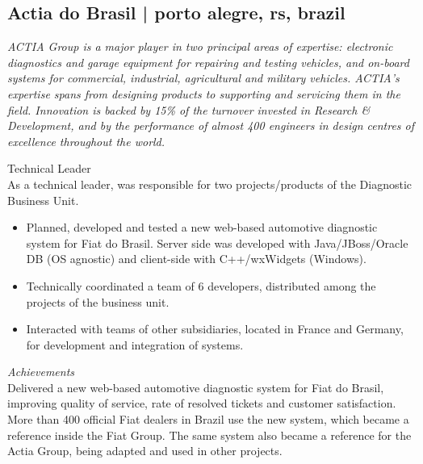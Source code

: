 \documentclass[10pt,a4paper]{article}
\newcommand{\years}[1]{\marginnote{{\small #1}}}
\begin{document}
{\subsection{Actia do Brasil | {\footnotesize{porto alegre, rs, brazil}}}
{\footnotesize\textit{ACTIA Group is a major player in two principal areas of expertise: electronic diagnostics and garage equipment for repairing and testing vehicles, and on-board systems for commercial, industrial, agricultural and military vehicles. ACTIA's expertise spans from designing products to supporting and servicing them in the field. Innovation is backed by 15\% of the turnover invested in Research \& Development, and by the performance of almost 400 engineers in design centres of excellence throughout the world.}}
\medskip

\years{Apr 2007 -\\ Jul 2010}Technical Leader\\
As a technical leader, was responsible for two projects/products of the Diagnostic Business Unit.
\begin{itemize}
  \item Planned, developed and tested a new web-based automotive diagnostic system for Fiat do Brasil. Server side was developed with Java/JBoss/Oracle DB (OS agnostic) and client-side with C++/wxWidgets (Windows).
  \item Technically coordinated a team of 6 developers, distributed among the projects of the business unit.
  \item Interacted with teams of other subsidiaries, located in France and Germany, for development and integration of systems.
\end{itemize}
\emph{Achievements}\\
Delivered a new web-based automotive diagnostic system for Fiat do Brasil, improving quality of service, rate of resolved tickets and customer satisfaction. More than 400 official Fiat dealers in Brazil use the new system, which became a reference inside the Fiat Group. The same system also became a reference for the Actia Group, being adapted and used in other projects.\\

}
\end{document}
